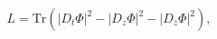 \begin{equation}
L=\text{$\mathrm{Tr}$}(\left\vert D_{t}\Phi\right\vert ^{2}-\left\vert
D_{z}\Phi\right\vert ^{2}-\left\vert D_{\bar{z}}\Phi\right\vert ^{2}),
\end{equation}

